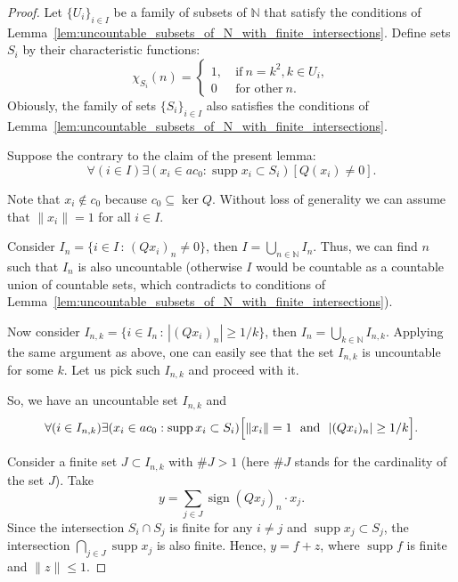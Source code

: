 \documentclass[a4paper,14pt]{article} %
\DeclareMathOperator{\supp}{supp}
\theoremstyle{plain}
\theoremstyle{definition}
\begin{document}
\begin{proof}
	Let $\{U_i\}_{i \in I}$ be a family of subsets of $\mathbb{N}$
	that satisfy the conditions of Lemma~\ref{lem:uncountable_subsets_of_N_with_finite_intersections}.
	Define sets $S_i$ by their characteristic functions:
	\begin{equation}
		\chi_{S_i} (n) = \begin{cases}
			1, & ~\mbox{if}~ n = k^2, k\in U_i,
			\\
			0  & ~\mbox{for other}~n.
		\end{cases}
	\end{equation}
	Obiously, the family of sets $\{S_i\}_{i \in I}$ also
	satisfies the conditions of Lemma~\ref{lem:uncountable_subsets_of_N_with_finite_intersections}.

	Suppose the contrary to the claim of the present lemma:
	\begin{equation}
		\forall(i\in I)\exists(x_i \in ac_0 : \supp x_i \subset S_i)[Q(x_i) \neq 0]
		.
	\end{equation}

	Note that $x_i \notin c_0$ because $c_0\subseteq \ker Q$.
	Without loss of generality we can assume that $\|x_i\|=1$ for all $i \in I$.

	Consider $I_n = \{i \in I\,:\,(Qx_i)_n \neq 0\}$,
	then $I = \bigcup\limits_{n\in\mathbb{N}} I_n$.
	Thus, we can find $n$ such that $I_n$ is also uncountable
	(otherwise $I$ would be countable as a countable union of countable sets,
	which contradicts to conditions of Lemma~\ref{lem:uncountable_subsets_of_N_with_finite_intersections}).

	Now consider $I_{n,k} = \{i \in I_n\,:\,|(Qx_i)_n| \geq 1/k\}$,
	then $I_n = \bigcup\limits_{k\in\mathbb{N}} I_{n,k}$.
	Applying the same argument as above, one can easily see that the set $I_{n,k}$ is uncountable for some $k$.
	Let us pick such $I_{n,k}$ and proceed with it.

	So, we have an uncountable set $I_{n,k}$ and
	\begin{equation}
		\forall(i\in I_{n,k})\exists(x_i \in ac_0 : \supp x_i \subset S_i)\Bigl[\|x_i\|=1 \mbox{~~and~~} |(Qx_i)_n| \geq 1/k\Bigr]
		.
	\end{equation}

	Consider a finite set $J \subset I_{n,k}$ with $\#J>1$
	(here $\#J$ stands for the cardinality of the set $J$).
	Take
	\begin{equation}
		y = \sum_{j \in J} \operatorname{sign}{(Qx_j)_n} \cdot x_j
		.
	\end{equation}
	Since the intersection $S_i \cap S_j$ is finite for any $i \neq j$ and
	$\supp x_j \subset S_j$,
	the intersection $\bigcap\limits_{j\in J} \supp x_j$ is also finite.
	Hence, $y = f + z$,
	where $\supp f$ is finite and $\|z\| \leq 1$.


\end{proof}
\end{document}
